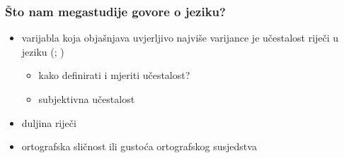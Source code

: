 \documentclass[aspectratio=169]{beamer}
\newcommand{\tinycitep}[1]{%
    \bgroup
    \scriptsize
    \citep{#1}
    \egroup}
\begin{document}
\begin{frame}
    \frametitle{Što nam megastudije govore o jeziku?}

    \begin{itemize}
        \item varijabla koja objašnjava uvjerljivo najviše varijance je
            učestalost riječi u jeziku
            \bgroup
            \scriptsize
            (\citealp*{balotaVisualWordRecognition2006};
            \citealp[ch. 6]{harleyPsychologyLanguageData2014})
            \egroup
        \begin{itemize}
            \pause

            \item kako definirati i mjeriti učestalost?

            \pause

            \item subjektivna učestalost
        \end{itemize}

        \pause

        \item duljina riječi \tinycitep{ferrandMEGALEXMegastudyVisual2018,
            brysbaertImpactWordPrevalence2016}

        \pause

        \item ortografska sličnost ili gustoća ortografskog susjedstva
            \tinycitep{coltheartAccessInternalLexicon1977,
            yarkoniMovingColtheartNew2008}
    \end{itemize}
\end{frame}
\end{document}

